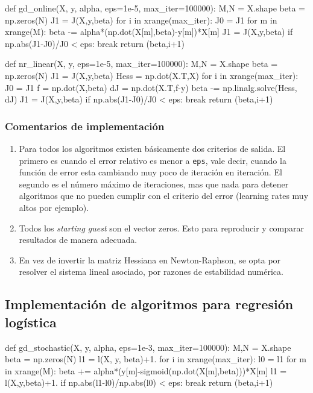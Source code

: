\documentclass[spanish, fleqn]{article}
\begin{document}
\begin{python}
def gd_online(X, y, alpha, eps=1e-5, max_iter=100000):
    M,N = X.shape
    beta = np.zeros(N)
    J1 = J(X,y,beta)
    for i in xrange(max_iter):
        J0 = J1
        for m in xrange(M):
            beta -= alpha*(np.dot(X[m],beta)-y[m])*X[m]
        J1 = J(X,y,beta)
        if np.abs(J1-J0)/J0 < eps: break
    return (beta,i+1)
\end{python}

\begin{python}
def nr_linear(X, y, eps=1e-5, max_iter=100000):
    M,N = X.shape
    beta = np.zeros(N)
    J1 = J(X,y,beta)
    Hess = np.dot(X.T,X)
    for i in xrange(max_iter):
        J0 = J1
        f = np.dot(X,beta)
        dJ = np.dot(X.T,f-y)
        beta -= np.linalg.solve(Hess, dJ)
        J1 = J(X,y,beta)
        if np.abs(J1-J0)/J0 < eps: break
    return (beta,i+1)
\end{python}

\subsubsection*{Comentarios de implementación}
\begin{enumerate}
	\item Para todos los algoritmos existen básicamente dos criterios de salida. El primero es
	cuando el error relativo es menor a \texttt{eps}, vale decir, cuando la función de error esta
	cambiando muy poco de iteración en iteración. El segundo es el número máximo de iteraciones, mas
	que nada para detener algoritmos que no pueden cumplir con el criterio del error (learning rates muy
	altos por ejemplo).
	\item Todos los \textit{starting guest} son el vector zeros. Esto para reproducir y comparar resultados
	de manera adecuada.
	\item En vez de invertir la matriz Hessiana en Newton-Raphson, se opta por resolver el sistema lineal
	asociado, por razones de estabilidad numérica.
\end{enumerate}

\newpage
\subsection*{Implementación de algoritmos para regresión logística}

\begin{python}
def gd_stochastic(X, y, alpha, eps=1e-3, max_iter=100000):
    M,N = X.shape
    beta = np.zeros(N)
    l1 = l(X, y, beta)+1.
    for i in xrange(max_iter):
        l0 = l1
        for m in xrange(M):
            beta += alpha*(y[m]-sigmoid(np.dot(X[m],beta)))*X[m]
        l1 = l(X,y,beta)+1.
        if np.abs(l1-l0)/np.abs(l0) < eps: break
    return (beta,i+1)
\end{python}
\end{document}
